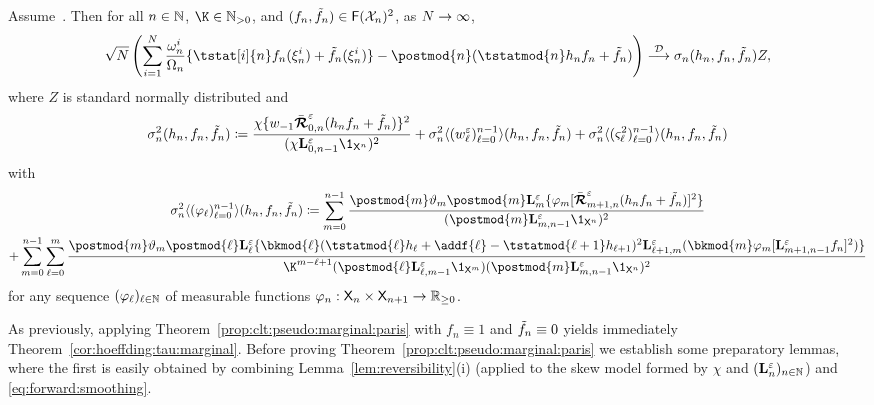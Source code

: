 \begin{theorem}
\label{prop:clt:pseudo:marginal:paris}
Assume~. Then for all $n \in \mathbb{N}$, $\K \in \nsetpos$, and $(f_n, \tilde{f}_{n}) \in \mathsf{F}(\mathcal{X}_n)^2$, as $N \to \infty$, 
$$
 \sqrt{\N} \left( \sum_{i = 1}^\N \frac{\ewght{n}{i}}{\sumwght{n}} \{\tstat[i]{n} f_n(\epart{n}{i}) + \ftd{n}(\epart{n}{i}) \} - \postmod{n}(\tstatmod{n} h_n f_n + \ftd{n}) \right) 
  \dlim \sigma_n(h_n, f_n, \ftd{n}) Z,
$$
where $Z$ is standard normally distributed and 
\begin{equation} \label{eq:non-recursive:as:var:affine}
\sigma^2_n (h_n, f_n, \ftd{n}) \eqdef \frac{\chi \{ \initwgtfunc
\retrokmodmodnorm_{0, n} (h_n f_n + \ftd{n}) \}^2}{(\chi \ukmod{0, n - 1} \1_{\Xset^n})^2} 
+ \sigma^2_n \langle (\wgtfuncmod{\ell})_{\ell = 0}^{n - 1} \rangle (h_n, f_n, \ftd{n}) 
+ \sigma^2_n \langle (\ukestvar{\ell})_{\ell = 0}^{n - 1} \rangle (h_n, f_n, \ftd{n}) 
\end{equation}
with
\begin{multline} \label{eq:partial:variance}
\sigma^2_n \langle (\varphi_\ell)_{\ell = 0}^{n - 1} \rangle (h_n, f_n, \ftd{n}) 
\eqdef \sum_{m = 0}^{n - 1} \frac{\postmod{m} \adjfuncforward{m} \postmod{m} \ukmod{m} \{ \varphi_m [\retrokmodmodnorm_{m + 1, n} (h_n f_n + \ftd{n})]^2
\}}{(\postmod{m} \ukmod{m, n - 1} \1_{\Xset^n})^2} \\
+ \sum_{m = 0}^{n - 1} \sum_{\ell = 0}^m \frac{\postmod{m} \adjfuncforward{m} \postmod{\ell} \ukmod{\ell} \{\bkmod{\ell}(\tstatmod{\ell} h_{\ell} + \addf{\ell} - \tstatmod{\ell + 1} h_{\ell +1})^2 \ukmod{\ell + 1, m}( \bkmod{m} \varphi_m [\ukmod{m + 1, n - 1} f_n]^2
)\}}{\K^{m - \ell + 1} (\postmod{\ell} \ukmod{\ell, m - 1} \1_{\Xset^m})(\postmod{m} \ukmod{m, n - 1} \1_{\Xset^n})^2}
\end{multline}
for any sequence $(\varphi_\ell)_{\ell \in \mathbb{N}}$ of measurable functions $\varphi_n : \mathsf{X}_n \times \mathsf{X}_{n + 1} \to \mathbb{R}_{\geq 0}$. 
\end{theorem}

As previously, applying Theorem~\ref{prop:clt:pseudo:marginal:paris} with $f_n \equiv 1$ and $\tilde{f}_{n} \equiv 0$ yields immediately Theorem~\ref{cor:hoeffding:tau:marginal}. Before proving Theorem~\ref{prop:clt:pseudo:marginal:paris} we establish some preparatory lemmas, where the first is easily obtained by combining Lemma~\ref{lem:reversibility}(i) (applied to the skew model formed by $\chi$ and $(\mathbf{L}_{n}^\varepsilon)_{n \in \mathbb{N}}$) and \eqref{eq:forward:smoothing}. 

